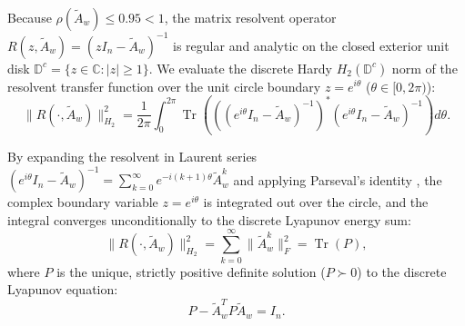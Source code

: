 \documentclass[journal]{IEEEtran}
\begin{document}
Because $\rho(\tilde{A}_w) \le 0.95 < 1$, the matrix resolvent operator $R(z, \tilde{A}_w) = (z I_n - \tilde{A}_w)^{-1}$ is regular and analytic on the closed exterior unit disk $\mathbb{D}^c = \{z \in \mathbb{C} : |z| \ge 1\}$. We evaluate the discrete Hardy $H_2(\mathbb{D}^c)$ norm of the resolvent transfer function over the unit circle boundary $z = e^{i\theta}$ ($\theta \in [0, 2\pi)$):
\begin{equation}
\| R(\cdot, \tilde{A}_w) \|_{H_2}^2 = \frac{1}{2\pi} \int_0^{2\pi} \operatorname{Tr}\left( \left((e^{i\theta} I_n - \tilde{A}_w)^{-1}\right)^* (e^{i\theta} I_n - \tilde{A}_w)^{-1} \right) d\theta.
\label{eq:hardy}
\end{equation}

By expanding the resolvent in Laurent series $(e^{i\theta} I_n - \tilde{A}_w)^{-1} = \sum_{k=0}^\infty e^{-i(k+1)\theta} \tilde{A}_w^k$ and applying Parseval's identity \cite{Hardy1915, Trefethen2005}, the complex boundary variable $z = e^{i\theta}$ is integrated out over the circle, and the integral converges unconditionally to the discrete Lyapunov energy sum:
\begin{equation}
\| R(\cdot, \tilde{A}_w) \|_{H_2}^2 = \sum_{k=0}^\infty \| \tilde{A}_w^k \|_F^2 = \operatorname{Tr}(P),
\label{eq:hardy_lyapunov}
\end{equation}
where $P$ is the unique, strictly positive definite solution ($P \succ 0$) to the discrete Lyapunov equation:
\begin{equation}
P - \tilde{A}_w^T P \tilde{A}_w = I_n.
\label{eq:lyapunov_eq}
\end{equation}
\end{document}
